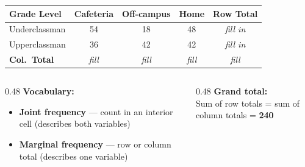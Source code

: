 \documentclass[aspectratio=169, 11pt]{beamer}
\begin{document}
{
\begin{frame}[t, plain]
  \hspace{0.4cm}%
  \begin{minipage}{0.93\textwidth}
    \vspace{0.3cm}
    \small
    \renewcommand{\arraystretch}{1.8}
    \begin{tabular}{l cccc}
    \rowcolor{sky}
    \textbf{Grade Level} & \textbf{Cafeteria} & \textbf{Off-campus} & \textbf{Home} & \textbf{Row Total} \\
    \hline
    Underclassman & 54 & 18 & 48 & \textcolor{navy!60}{\textit{fill in}} \\
    Upperclassman & 36 & 42 & 42 & \textcolor{navy!60}{\textit{fill in}} \\
    \hline
    \textbf{Col.\ Total} & \textcolor{navy!60}{\textit{fill}} & \textcolor{navy!60}{\textit{fill}} & \textcolor{navy!60}{\textit{fill}} & \textcolor{navy!60}{\textit{fill}} \\
    \end{tabular}

    \vspace{0.5cm}
    \begin{columns}[T]
      \begin{column}{0.48\textwidth}
        \textbf{\color{navy}Vocabulary:}
        \begin{itemize}\setlength{\itemsep}{0.3em}
          \item \textbf{Joint frequency} --- count in an interior cell (describes both variables)
          \item \textbf{Marginal frequency} --- row or column total (describes one variable)
        \end{itemize}
      \end{column}
      \begin{column}{0.48\textwidth}
        \textbf{\color{navy}Grand total:}\\
        Sum of row totals = sum of column totals = \textbf{240}
      \end{column}
    \end{columns}
  \end{minipage}
\end{frame}
}
\end{document}
